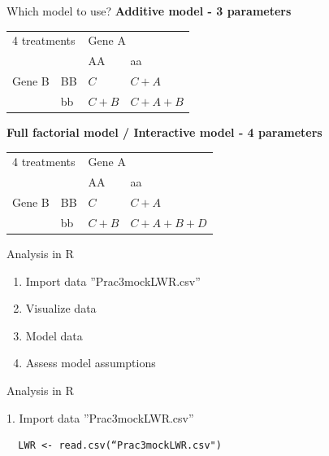\documentclass{beamer}
\makeatletter
\newenvironment{kframe}{%
 \def\at@end@of@kframe{}%
 \ifinner\ifhmode%
  \def\at@end@of@kframe{\end{minipage}}%
  \begin{minipage}{\columnwidth}%
 \fi\fi%
 \def\FrameCommand##1{\hskip\@totalleftmargin \hskip-\fboxsep
 \colorbox{shadecolor}{##1}\hskip-\fboxsep
     \hskip-\linewidth \hskip-\@totalleftmargin \hskip\columnwidth}%
 \MakeFramed {\advance\hsize-\width
   \@totalleftmargin\z@ \linewidth\hsize
   \@setminipage}}%
 {\par\unskip\endMakeFramed%
 \at@end@of@kframe}
\newenvironment{knitrout}{}{} %
\makeatother
\begin{document}
\begin{frame}{Which model to use?}
 \textbf{Additive model - 3 parameters}
\begin{center}
\begin{tabular}{|l | l | l | l | }
\toprule
  \multicolumn{2}{|l|}{4 treatments} & \multicolumn{2}{l|}{Gene A}\\
  \cmidrule(lr){3-4}
  \multicolumn{2}{|l|}{}  & AA & aa\\
 	    \midrule
      Gene B & BB & $C$ & $C+A$\\
      \cmidrule(lr){3-4}
 	    & bb & $C+B$ & $C+A+B$\\
	    \bottomrule
  \end{tabular}
\end{center}
 

\textbf{Full factorial model / Interactive model - 4 parameters }
\begin{center}
\begin{tabular}{|l | l | l | l | }
\toprule
  \multicolumn{2}{|l|}{4 treatments} & \multicolumn{2}{l|}{Gene A}\\
  \cmidrule(lr){3-4}
  \multicolumn{2}{|l|}{}  & AA & aa\\
 	    \midrule
      Gene B & BB & $C$ & $C+A$\\
      \cmidrule(lr){3-4}
 	    & bb & $C+B$ & $C+A+B+D$\\
	    \bottomrule
  \end{tabular}
\end{center}
\end{frame}

\begin{frame}{Analysis in R}
 
 \begin{enumerate}
  \item Import data ''Prac3mockLWR.csv''
  \item Visualize data
  \item Model data
  \item Assess model assumptions
 \end{enumerate}

\end{frame}

\begin{frame}[fragile]{Analysis in R}
 
 1. Import data ''Prac3mockLWR.csv''
 
 \begin{knitrout}
\color{fgcolor}\begin{kframe}
\begin{verbatim}
  LWR <- read.csv(“Prac3mockLWR.csv")
 \end{verbatim}
\end{kframe}
\end{knitrout}
 
\end{frame}
\end{document}
